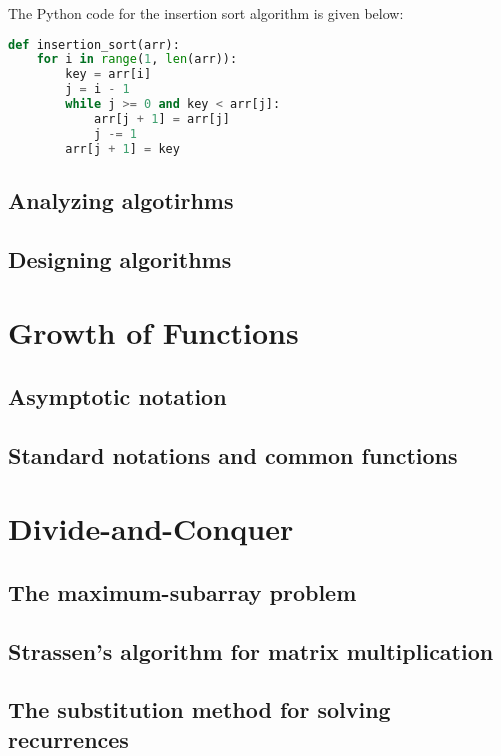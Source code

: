 \documentclass{book}
\begin{document}
The Python code for the insertion sort algorithm is given below:

\begin{lstlisting}[language=Python]
def insertion_sort(arr):
    for i in range(1, len(arr)):
        key = arr[i]
        j = i - 1
        while j >= 0 and key < arr[j]:
            arr[j + 1] = arr[j]
            j -= 1
        arr[j + 1] = key
\end{lstlisting}

\section{Analyzing algotirhms}

\section{Designing algorithms}


\chapter{Growth of Functions}
\section{Asymptotic notation}

\section{Standard notations and common functions}




\chapter{Divide-and-Conquer}
\section{The maximum-subarray problem}

\section{Strassen's algorithm for matrix multiplication}

\section{The substitution method for solving recurrences}
\end{document}
